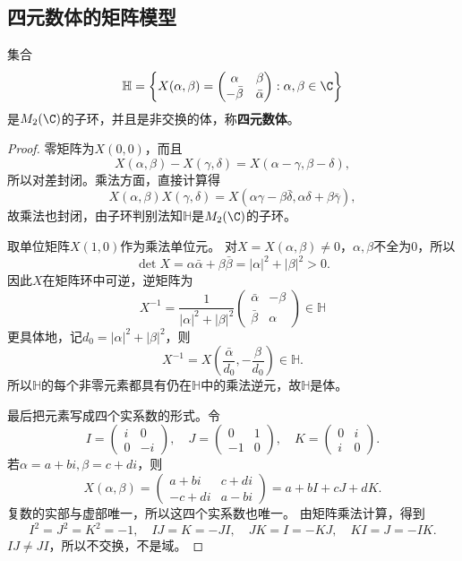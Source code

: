 \subsection*{四元数体的矩阵模型}
\begin{proposition}
\label{p2:concept:c1-l1092}集合
\[
\mathbb H=\left\{X(\alpha,\beta)=
\begin{pmatrix}\alpha&\beta\\-\bar\beta&\bar\alpha\end{pmatrix}:
\alpha,\beta\in\C\right\}
\]
是$M_2(\C)$的子环，并且是非交换的体，称\textbf{四元数体}。
\end{proposition}
\begin{proof}

零矩阵为$X(0,0)$，而且
\[
X(\alpha,\beta)-X(\gamma,\delta)
=X(\alpha-\gamma,\beta-\delta),
\]
所以对差封闭。乘法方面，直接计算得
\[
X(\alpha,\beta)X(\gamma,\delta)
=X(\alpha\gamma-\beta\bar\delta,\alpha\delta+\beta\bar\gamma),
\]
故乘法也封闭，由子环判别法知$\mathbb H$是$M_2(\C)$的子环。

取单位矩阵$X(1,0)$作为乘法单位元。
对$X=X(\alpha,\beta)\neq0$，$\alpha,\beta$不全为0，所以
\[
\det X=\alpha\bar\alpha+\beta\bar\beta=|\alpha|^2+|\beta|^2>0.
\]
因此$X$在矩阵环中可逆，逆矩阵为
\[
X^{-1}=\frac1{|\alpha|^2+|\beta|^2}
\begin{pmatrix}\bar\alpha&-\beta\\\bar\beta&\alpha\end{pmatrix}\in\mathbb H
\]
更具体地，记$d_0=|\alpha|^2+|\beta|^2$，则
\[
X^{-1}=X\left(\frac{\bar\alpha}{d_0},-\frac{\beta}{d_0}\right)\in\mathbb H.
\]
所以$\mathbb H$的每个非零元素都具有仍在$\mathbb H$中的乘法逆元，故$\mathbb H$是体。

最后把元素写成四个实系数的形式。令
\[
I=\begin{pmatrix}i&0\\0&-i\end{pmatrix},\quad
J=\begin{pmatrix}0&1\\-1&0\end{pmatrix},\quad
K=\begin{pmatrix}0&i\\i&0\end{pmatrix}.
\]
若$\alpha=a+bi,\beta=c+di$，则
\[
X(\alpha,\beta)
=\begin{pmatrix}a+bi&c+di\\-c+di&a-bi\end{pmatrix}
=a+bI+cJ+dK.
\]
复数的实部与虚部唯一，所以这四个实系数也唯一。
由矩阵乘法计算，得到
\[
I^2=J^2=K^2=-1,\quad IJ=K=-JI,\quad JK=I=-KJ,\quad KI=J=-IK.
\]
$IJ\neq JI$，所以不交换，不是域。
\end{proof}

